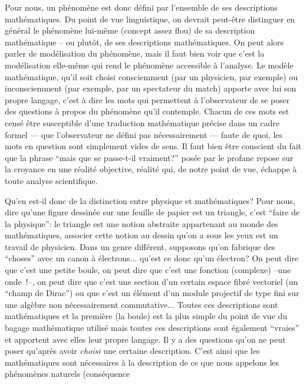 Pour nous, un ph\'enom\`ene est donc d\'efini par l'ensemble de ses
descriptions math\'ematiques. Du point de vue linguistique, on
devrait peut-\^etre distinguer en g\'en\'eral le ph\'enom\`ene lui-m\^eme
(concept assez flou) de sa description math\'ematique -- ou plut\^ot,
de ses descriptions math\'ematiques. On peut alors parler de
mod\'elisation du ph\'enom\`ene, mais il faut bien voir que c'est la
mod\'elisation elle-m\^eme qui rend le ph\'enom\`ene accessible \`a
l'analyse. Le mod\`ele math\'ematique, qu'il soit choisi consciemment
(par un physicien, par exemple) ou inconsciemment (par exemple, par un
spectateur du match) apporte avec lui son propre langage, c'est \`a
dire les mots qui permettent \`a l'observateur de se poser des
questions \`a propos du ph\'enom\`ene qu'il contemple. Chacun de ces
mots est cens\'e \^etre susceptible d'une traduction math\'ematique
pr\'ecise dans un cadre formel --- que l'observateur ne d\'efini pas
n\'ecessairement --- faute de quoi, les mots en question sont simplement
vides de sens. Il faut bien \^etre conscient du fait que la phrase
``mais que se passe-t-il vraiment?'' pos\'ee par le profane
repose sur la croyance en une r\'ealit\'e objective, r\'ealit\'e qui,
de notre point de vue, \'echappe \`a toute analyse scientifique.\par
Qu'en est-il donc de la distinction entre physique et
math\'ematiques? Pour nous, dire qu'une figure dessin\'ee sur une
feuille de papier est un triangle, c'est ``faire de la physique'': le
triangle est une notion abstraite appartenant au
monde des math\'ematiques, associer cette notion au dessin qu'on
a sous les yeux est un travail de physicien. Dans un genre
diff\'erent, supposons qu'on fabrique des ``choses'' avec un canon
\`a \'electrons$\ldots$ qu'est ce donc qu'un \'electron? On peut dire
que c'est une petite boule, on peut dire que c'est une fonction
(complexe) --une onde~!--, on peut dire que c'est une section d'un
certain espace fibr\'e vectoriel (un ``champ de Dirac'') ou que c'est un
\'el\'ement d'un module projectif de type fini sur une alg\`ebre non
n\'ecessairement commutative$\ldots$ Toutes ces descriptions sont
math\'ematiques et la premi\`ere (la boule) est la plus simple du
point de vue du bagage math\'ematique utilis\'e mais toutes ces
descriptions sont \'egalement ``vraies'' et apportent avec elles
leur propre langage. Il y a des questions qu'on ne peut poser
qu'apr\`es avoir {\it choisi} une certaine description. C'est ainsi
que les math\'ematiques sont n\'ecessaires \`a la description de ce
que nous appelons les ph\'enom\`enes naturels (cons\'equence
